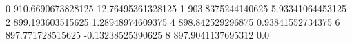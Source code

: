 0 910.6690673828125 12.76495361328125
1 903.8375244140625 5.93341064453125
2 899.193603515625 1.28948974609375
4 898.842529296875 0.93841552734375
6 897.771728515625 -0.13238525390625
8 897.9041137695312 0.0
